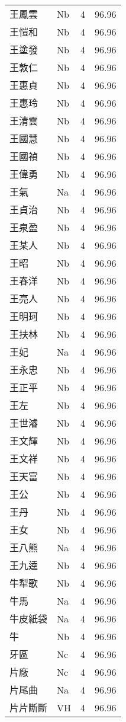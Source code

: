 \documentclass[twocolumn]{book}
\begin{document}
\begin{supertabular}{llrr}
王鳳雲 & Nb & 4 &  96.96\\
王愷和 & Nb & 4 &  96.96\\
王塗發 & Nb & 4 &  96.96\\
王敦仁 & Nb & 4 &  96.96\\
王惠貞 & Nb & 4 &  96.96\\
王惠玲 & Nb & 4 &  96.96\\
王清雲 & Nb & 4 &  96.96\\
王國慧 & Nb & 4 &  96.96\\
王國禎 & Nb & 4 &  96.96\\
王偉勇 & Nb & 4 &  96.96\\
王氣 & Na & 4 &  96.96\\
王貞治 & Nb & 4 &  96.96\\
王泉盈 & Nb & 4 &  96.96\\
王某人 & Nb & 4 &  96.96\\
王昭 & Nb & 4 &  96.96\\
王春洋 & Nb & 4 &  96.96\\
王亮人 & Nb & 4 &  96.96\\
王明珂 & Nb & 4 &  96.96\\
王扶林 & Nb & 4 &  96.96\\
王妃 & Na & 4 &  96.96\\
王永忠 & Nb & 4 &  96.96\\
王正平 & Nb & 4 &  96.96\\
王左 & Nb & 4 &  96.96\\
王世濬 & Nb & 4 &  96.96\\
王文輝 & Nb & 4 &  96.96\\
王文祥 & Nb & 4 &  96.96\\
王天富 & Nb & 4 &  96.96\\
王公 & Nb & 4 &  96.96\\
王丹 & Nb & 4 &  96.96\\
王女 & Nb & 4 &  96.96\\
王八熊 & Na & 4 &  96.96\\
王九逵 & Nb & 4 &  96.96\\
牛犁歌 & Nb & 4 &  96.96\\
牛馬 & Na & 4 &  96.96\\
牛皮紙袋 & Na & 4 &  96.96\\
牛 & Nb & 4 &  96.96\\
牙區 & Nc & 4 &  96.96\\
片廠 & Nc & 4 &  96.96\\
片尾曲 & Na & 4 &  96.96\\
片片斷斷 & VH & 4 &  96.96\\

\end{supertabular}
\end{document}

